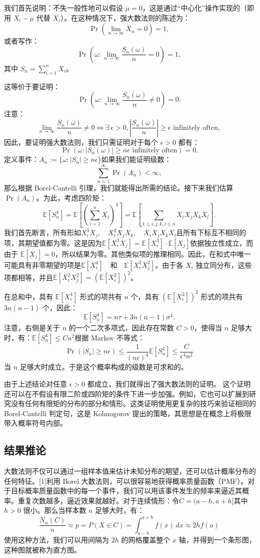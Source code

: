 我们首先说明：不失一般性地可以假设 $\mu = 0$，这是通过“中心化”操作实现的（即用 $X_i - \mu$ 代替 $X_i$）。在这种情况下，强大数法则的陈述为：
$$
\Pr\left(\lim_{n \to \infty} \overline{X}_n = 0\right) = 1,~
$$
或者写作：
$$
\Pr\left(\omega : \lim_{n \to \infty} \frac{S_n(\omega)}{n} = 0\right) = 1,~
$$
其中 $S_n = \sum_{i=1}^n X_i$。

这等价于要证明：
$$
\Pr\left(\omega : \lim_{n \to \infty} \frac{S_n(\omega)}{n} \neq 0\right) = 0.~
$$
注意：
$$
\lim_{n \to \infty} \frac{S_n(\omega)}{n} \neq 0 \iff \exists\, \epsilon > 0, \left|\frac{S_n(\omega)}{n}\right| \geq \epsilon \text{ infinitely often},~
$$
因此，要证明强大数法则，我们只需证明对于每个 $\epsilon > 0$ 都有：
$$
\Pr\left(\omega : |S_n(\omega)| \geq n\epsilon \text{ infinitely often}\right) = 0.~
$$
定义事件：$A_n := \{\omega : |S_n| \geq n\epsilon\}$如果我们能证明级数：
$$
\sum_{n=1}^{\infty} \Pr(A_n) < \infty,~
$$
那么根据 Borel-Cantelli 引理，我们就能得出所需的结论。接下来我们估算 $\Pr(A_n)$。为此，考虑四阶矩：
$$
\mathbb{E}[S_n^4] = \mathbb{E}\left[\left(\sum_{i=1}^n X_i\right)^4\right] = \mathbb{E}\left[\sum_{1 \leq i, j, k, l \leq n} X_i X_j X_k X_l\right].~
$$
我们首先断言，所有形如$X_i^3 X_j, \quad X_i^2 X_j X_k, \quad X_i X_j X_k X_l$且所有下标互不相同的项，其期望值都为零。这是因为$\mathbb{E}[X_i^3 X_j] = \mathbb{E}[X_i^3] \cdot \mathbb{E}[X_j]$依据独立性成立，而由于 $\mathbb{E}[X_j] = 0$，所以结果为零。其他类似项的推理相同。因此，在和式中唯一可能具有非零期望的项是$\mathbb{E}[X_i^4] \quad \text{和} \quad \mathbb{E}[X_i^2 X_j^2]$。由于各 $X_i$ 独立同分布，这些项都相等，并且$\mathbb{E}[X_i^2 X_j^2] = \left( \mathbb{E}[X_i^2] \right)^2$。

在总和中，具有 $\mathbb{E}[X_i^4]$ 形式的项共有 $n$ 个，具有 $\left( \mathbb{E}[X_i^2] \right)^2$ 形式的项共有 $3n(n - 1)$ 个，因此：
$$
\mathbb{E}[S_n^4] = n \tau + 3n(n - 1) \sigma^4.~
$$
注意，右侧是关于 $n$ 的一个二次多项式，因此存在常数 $C > 0$，使得当 $n$ 足够大时，有：$\mathbb{E}[S_n^4] \leq C n^2$根据 Markov 不等式：
$$
\Pr(|S_n| \geq n \epsilon) \leq \frac{1}{(n \epsilon)^4} \mathbb{E}[S_n^4] \leq \frac{C}{\epsilon^4 n^2}~
$$
当 $n$ 足够大时成立。于是这个概率构成的级数是可求和的。

由于上述结论对任意 $\epsilon > 0$ 都成立，我们就得出了强大数法则的证明。
这个证明还可以在不假设有限二阶或四阶矩的条件下进一步加强。例如，它也可以扩展到研究没有任何有限矩的分布的部分和情形。这类证明使用更复杂的技巧来验证相同的 Borel-Cantelli 判定句，这是 Kolmogorov 提出的策略，其思想是在概念上将极限带入概率符号内部。
\subsection{结果推论}
大数法则不仅可以通过一组样本值来估计未知分布的期望，还可以估计概率分布的任何特征。[1]利用 Borel 大数法则，可以很容易地获得概率质量函数（PMF）。对于目标概率质量函数中的每一个事件，我们可以用该事件发生的频率来逼近其概率。重复次数越多，逼近效果就越好。对于连续情形：令$C = (a - h, a + h]$其中 $h > 0$ 很小。那么当样本数 $n$ 足够大时，有：
$$
\frac{N_n(C)}{n} \approx p = P(X \in C) = \int_{a-h}^{a+h} f(x)\,dx \approx 2h f(a)~
$$
使用这种方法，我们可以用间隔为 $2h$ 的网格覆盖整个 $x$ 轴，并得到一个条形图，这种图就被称为直方图。
